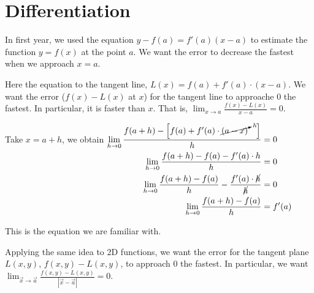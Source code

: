 \documentclass[11pt,fleqn]{book} %
\begin{document}
\section{Differentiation}

In first year, we used the equation $y - f(a) = f'(a) (x-a)$ to estimate the function $y = f(x)$ at the point $a$. We want the error to decrease the fastest when we approach $x = a$. 

    \begin{center}
    \end{center}
    
    Here the equation to the tangent line, $L(x) = f(a) + f'(a) \cdot (x-a)$. We want the error ($f(x) - L(x)$ at $x$) for the tangent line to approache $0$ the fastest. In particular, it is faster than $x$. That is, $\lim_{x\to{a}} \frac{f(x) - L(x)}{x - a} = 0$. 
    
    Take $x = a + h$, we obtain 
    $\begin{aligned}[t]
        \lim_{h\to0} \frac{f(a+h) - \left[ f(a) + f'(a) \cdot \cancelto{h}{(a - x)} ~~~ \right]}{h} 
        &= 0 \\
        \lim_{h\to0} \frac{f(a+h) - f(a) - f'(a) \cdot h}{h} 
        &= 0 \\
        \lim_{h\to0} \frac{f(a+h) - f(a)}{h} - \frac{f'(a) \cdot \cancel{h}}{\cancel{h}} 
        &= 0 \\ 
        \lim_{h\to0} \frac{f(a+h) - f(a)}{h}
        &= f'(a)
    \end{aligned}$
    
    This is the equation we are familiar with. 
    
    Applying the same idea to 2D functions, we want the error for the tangent plane $L(x,y)$, $f(x,y) - L(x,y)$, to approach $0$ the fastest. In particular, we want $\lim_{\vec{x}\to\vec{a}} \frac{f(x,y) - L(x,y)}{| \vec{x} - \vec{a} |} = 0$. 
    
\end{document}
